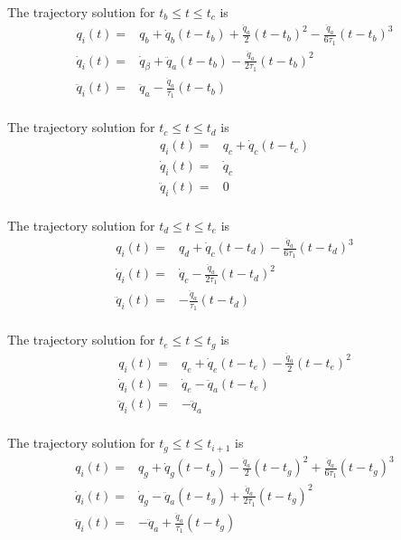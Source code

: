 The trajectory solution for $t_b \leq t \leq t_c$ is
\begin{equation}
\begin{aligned}
q_i(t) ={}& q_b + \dot{q}_b(t-t_b) + \frac{\ddot{q}_a}{2}(t-t_b)^2 - \frac{\ddot{q}_a}{6τ_1}(t-t_b)^3 \\
\dot{q}_i(t) ={}& \dot{q}_β + \ddot{q}_a(t-t_b) - \frac{\ddot{q}_a}{2τ_1}(t-t_b)^2 \\
\ddot{q}_i(t) ={}& \ddot{q}_a - \frac{\ddot{q}_a}{τ_1}(t-t_b) \\
\end{aligned}
\end{equation}

The trajectory solution for $t_c \leq t \leq t_d$ is
\begin{equation}
\begin{aligned}
q_i(t) ={}& q_c + \dot{q}_c(t-t_c) \\
\dot{q}_i(t) ={}& \dot{q}_c \\
\ddot{q}_i(t) ={}& 0 \\
\end{aligned}
\end{equation}

The trajectory solution for $t_d \leq t \leq t_e$ is
\begin{equation}
\begin{aligned}
q_i(t) ={}& q_d + \dot{q}_c(t-t_d) - \frac{\ddot{q}_a}{6τ_1}(t-t_d)^3 \\
\dot{q}_i(t) ={}& \dot{q}_c - \frac{\ddot{q}_a}{2τ_1}(t-t_d)^2 \\
\ddot{q}_i(t) ={}& -\frac{\ddot{q}_a}{τ_1}(t-t_d) \\
\end{aligned}
\end{equation}

The trajectory solution for $t_e \leq t \leq t_g$ is
\begin{equation}
\begin{aligned}
q_i(t) ={}& q_e + \dot{q}_e(t-t_e) - \frac{\ddot{q}_a}{2}(t-t_e)^2 \\
\dot{q}_i(t) ={}& \dot{q}_e - \ddot{q}_a(t-t_e) \\
\ddot{q}_i(t) ={}& -\ddot{q}_a \\
\end{aligned}
\end{equation}

The trajectory solution for $t_g \leq t \leq t_{i+1}$ is
\begin{equation}
\begin{aligned}
q_i(t) ={}& q_g + \dot{q}_g(t-t_g) - \frac{\ddot{q}_a}{2}(t-t_g)^2 + \frac{\ddot{q}_a}{6τ_1}(t-t_g)^3 \\
\dot{q}_i(t) ={}& \dot{q}_g - \ddot{q}_a(t-t_g) + \frac{\ddot{q}_a}{2τ_1}(t-t_g)^2 \\
\ddot{q}_i(t) ={}& -\ddot{q}_a + \frac{\ddot{q}_a}{τ_1}(t-t_g) \\
\end{aligned}
\end{equation}

